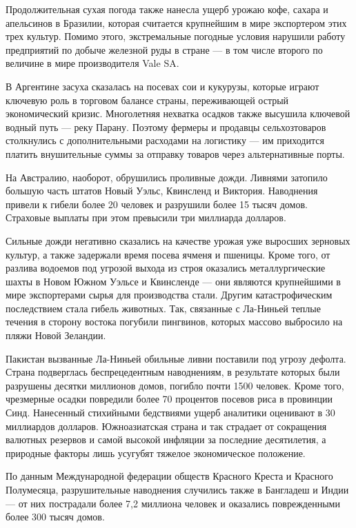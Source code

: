 Продолжительная сухая погода также нанесла ущерб урожаю кофе, сахара и апельсинов в Бразилии, которая считается крупнейшим в мире экспортером этих трех культур. Помимо этого, экстремальные погодные условия нарушили работу предприятий по добыче железной руды в стране — в том числе второго по величине в мире производителя Vale SA.

В Аргентине засуха сказалась на посевах сои и кукурузы, которые играют ключевую роль в торговом балансе страны, переживающей острый экономический кризис. Многолетняя нехватка осадков также высушила ключевой водный путь — реку Парану. Поэтому фермеры и продавцы сельхозтоваров столкнулись с дополнительными расходами на логистику — им приходится платить внушительные суммы за отправку товаров через альтернативные порты.

На Австралию, наоборот, обрушились проливные дожди. Ливнями затопило большую часть штатов Новый Уэльс, Квинсленд и Виктория. Наводнения привели к гибели более 20 человек и разрушили более 15 тысяч домов. Страховые выплаты при этом превысили три миллиарда долларов.

Сильные дожди негативно сказались на качестве урожая уже выросших зерновых культур, а также задержали время посева ячменя и пшеницы. Кроме того, от разлива водоемов под угрозой выхода из строя оказались металлургические шахты в Новом Южном Уэльсе и Квинсленде — они являются крупнейшими в мире экспортерами сырья для производства стали. Другим катастрофическим последствием стала гибель животных. Так, связанные с Ла-Ниньей теплые течения в сторону востока погубили пингвинов, которых массово выбросило на пляжи Новой Зеландии.

Пакистан вызванные Ла-Ниньей обильные ливни поставили под угрозу дефолта. Страна подверглась беспрецедентным наводнениям, в результате которых были разрушены десятки миллионов домов, погибло почти 1500 человек. Кроме того, чрезмерные осадки повредили более 70 процентов посевов риса в провинции Синд. Нанесенный стихийными бедствиями ущерб аналитики оценивают в 30 миллиардов долларов. Южноазиатская страна и так страдает от сокращения валютных резервов и самой высокой инфляции за последние десятилетия, а природные факторы лишь усугубят тяжелое экономическое положение.

По данным Международной федерации обществ Красного Креста и Красного Полумесяца, разрушительные наводнения случились также в Бангладеш и Индии — от них пострадали более 7,2 миллиона человек и оказались поврежденными более 300 тысяч домов.

